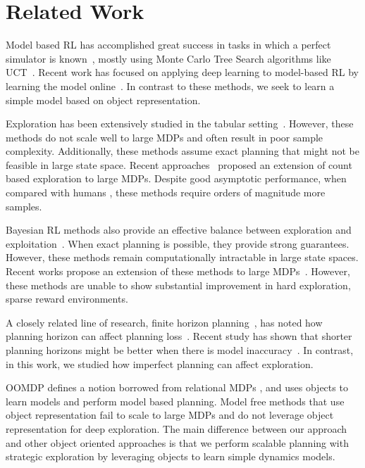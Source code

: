 \section{Related Work}

Model based RL has accomplished great success in tasks in which a perfect simulator is known~\citep{silver2016mastering, silver2017mastering}, mostly using Monte Carlo Tree Search algorithms like UCT~\citep{kocsis2006bandit, chaslot2010monte}. Recent work has focused on applying deep learning to model-based RL by learning the model online~\citep{rosin2011nested, finn2017deep, lenz2015deepmpc, weber2017imagination}. In contrast to these methods, we seek to learn a simple model based on object representation.

Exploration has been extensively studied in the tabular setting~\citep{brafman2002r,strehl2008analysis,jaksch2010near, osband2016posterior}. However, these methods do not scale well to large MDPs and often result in poor sample complexity. Additionally, these methods assume exact planning that might not be feasible in large state space. Recent approaches~\citep{bellemare2016unifying, ostrovski2017count, tang2017exploration} proposed an extension of count based exploration to large MDPs. Despite good asymptotic performance, when compared with humans \citep{tsividis2017human, lake2017building}, these methods require orders of magnitude more samples.

Bayesian RL methods also provide an effective balance between exploration and exploitation~\citep{ghavamzadeh2015bayesian}. When exact planning is possible, they provide strong guarantees. However, these methods remain computationally intractable in large state spaces. Recent works propose an extension of these methods to large MDPs~\citep{osband2016deep, azizzadenesheli2018efficient, fortunato2017noisy}. However, these methods are unable to show substantial improvement in hard exploration, sparse reward environments. 

A closely related line of research, finite horizon planning~\citep{kearns2002sparse, mannor2007bias, kearns1994introduction}, has noted how planning horizon can affect planning loss~\citep{kearns2002near, strehl2009reinforcement}. Recent study has shown that shorter planning horizons might be better when there is model inaccuracy~\citep{jiang2015dependence}. In contrast, in this work, we studied how imperfect planning can affect exploration.

OOMDP \citep{diuk2008object} defines a notion borrowed from relational MDPs \citep{guestrin2003generalizing}, and uses objects to learn models and perform model based planning. Model free methods that use object representation \citep{garnelo2016towards, roderick2017deep, cobo2013object} fail to scale to large MDPs and do not leverage object representation for deep exploration. The main difference between our approach and other object oriented approaches is that we perform scalable planning with strategic exploration by leveraging objects to learn simple dynamics models.

